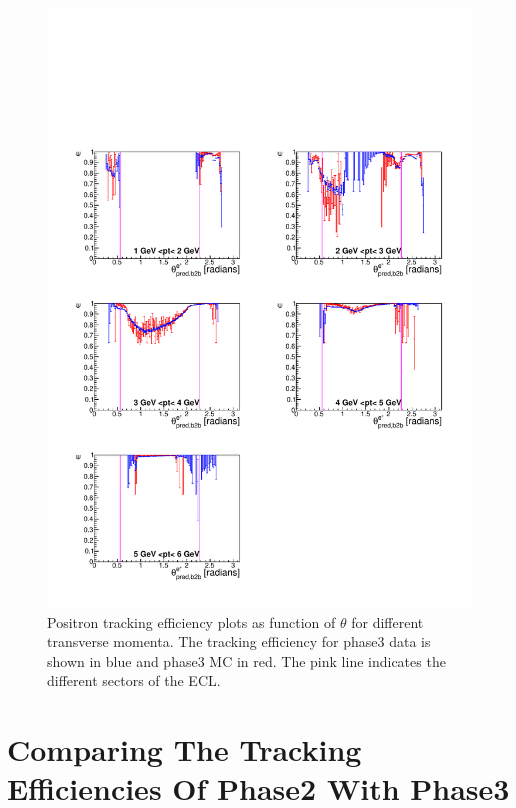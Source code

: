 \documentclass[a4paper,11pt,twosided,final,german,openbib,pdftex,listof=totoc,bibliography=totoc]{scrbook}
\begin{document}
\begin{figure}[!htbp]
	\centering
	\includegraphics[width=\textwidth]{Plots/master3/xPtMThetaepP3}
	\caption[Transverse Momentum $\theta$ Positron Efficiency Phase3]{Positron tracking efficiency plots as function of $\theta$ for different transverse momenta. The tracking efficiency for phase3 data is shown in blue and phase3 MC in red. The pink line indicates the different sectors of the ECL.}
	\label{plt:xPtMThetaep3}
\end{figure}


\clearpage




\chapter{Comparing The Tracking Efficiencies Of Phase2 With Phase3}
\label{cha:Comp}
\end{document}
